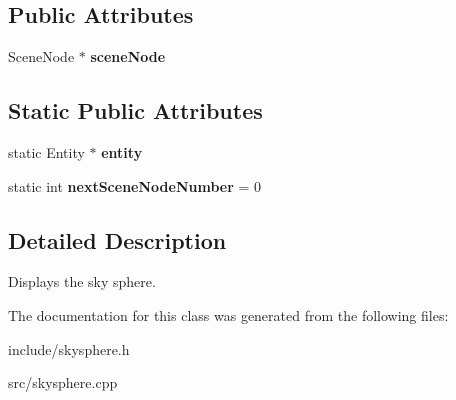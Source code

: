 \subsection*{\-Public \-Attributes}
\begin{DoxyCompactItemize}
\item 
\hypertarget{classSkySphere_a9828278ac3feece21b6fa7dda8c3e81b}{
\-Scene\-Node $\ast$ {\bfseries scene\-Node}}
\label{db/d4d/classSkySphere_a9828278ac3feece21b6fa7dda8c3e81b}

\end{DoxyCompactItemize}
\subsection*{\-Static \-Public \-Attributes}
\begin{DoxyCompactItemize}
\item 
\hypertarget{classSkySphere_a50f05da4625af0b96af63e523a7fd493}{
static \-Entity $\ast$ {\bfseries entity}}
\label{db/d4d/classSkySphere_a50f05da4625af0b96af63e523a7fd493}

\item 
\hypertarget{classSkySphere_a9dc9aa4071b9f8774808880123541150}{
static int {\bfseries next\-Scene\-Node\-Number} = 0}
\label{db/d4d/classSkySphere_a9dc9aa4071b9f8774808880123541150}

\end{DoxyCompactItemize}


\subsection{\-Detailed \-Description}
\-Displays the sky sphere. 

\-The documentation for this class was generated from the following files\-:\begin{DoxyCompactItemize}
\item 
include/skysphere.\-h\item 
src/skysphere.\-cpp\end{DoxyCompactItemize}
